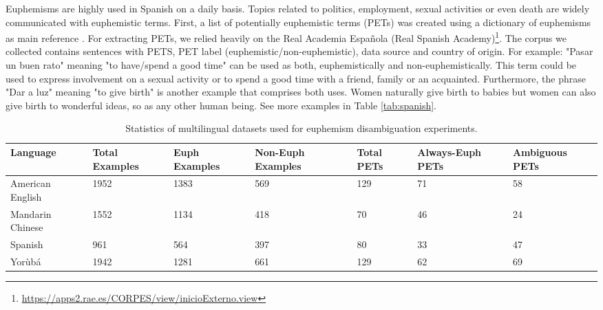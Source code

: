 \documentclass[11pt]{article}
\begin{document}
Euphemisms are highly used in Spanish on a daily basis. Topics related to politics, employment, sexual activities or even death are widely communicated with euphemistic terms. First, a list of potentially euphemistic terms (PETs) was created using a dictionary of euphemisms as main reference \cite{lechado2000dicionario_eufemismos,rodriguez1999creatividad}. For extracting PETs, we relied heavily on the Real Academia Espa\~{n}ola (Real Spanish Academy)\footnote{\url{https://apps2.rae.es/CORPES/view/inicioExterno.view}}. The corpus we collected contains sentences with PETS, PET label (euphemistic/non-euphemistic), data source and country of origin. For example: "Pasar un buen rato" meaning "to have/spend a good time" can be used as both, euphemistically and non-euphemistically. This term could be used to express involvement on a sexual activity or to spend a good time with a friend, family or an acquainted. Furthermore, the phrase "Dar a luz" meaning "to give birth" is another example that comprises both uses. Women naturally give birth to babies but women can also give birth to wonderful ideas, so as any other human being. See more examples in Table \ref{tab:spanish}.


\begin{table*}[!h]
\begin{center}
\begin{tabularx}{\textwidth}{|P{3cm}|Y|Y|Y|Y|Y|Y|} 
 \hline
 \textbf{Language} & \textbf{Total Examples} & \textbf{Euph Examples} & \textbf{Non-Euph Examples} & \textbf{Total PETs} & \textbf{Always-Euph PETs} & \textbf{Ambiguous PETs}\\
 \hline
 American English & 1952 & 1383 & 569 & 129 & 71 & 58 \\
 \hline
 Mandarin Chinese & 1552 & 1134 & 418 & 70 & 46 & 24 \\
 \hline
 Spanish & 961 & 564 & 397 & 80 & 33 & 47 \\
 \hline
 {Yor\`{u}b\'{a}} & 1942 & 1281 & 661 & 129 & 62 & 69 \\
 \hline
\end{tabularx}
\end{center}
\caption{Statistics of multilingual datasets used for euphemism disambiguation experiments.}
\label{tbl:multilingual_stats}
\end{table*}
\end{document}
